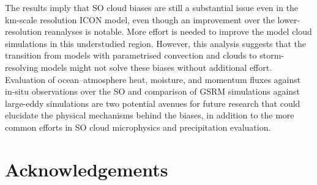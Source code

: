 \documentclass[12pt,a4paper]{article}
\begin{document}
The results imply that SO cloud biases are still a substantial issue even in
the km-scale resolution ICON model, even though an improvement over the
lower-resolution reanalyses is notable. More effort is needed to improve the
model cloud simulations in this understudied region. However, this analysis
suggests that the transition from models with parametrised convection and
clouds to storm-resolving models might not solve these biases without
additional effort.  Evaluation of ocean--atmosphere heat, moisture, and
momentum fluxes against in-situ observations over the SO and comparison of GSRM
simulations against large-eddy simulations are two potential avenues for future
research that could elucidate the physical mechanisms behind the biases, in
addition to the more common efforts in SO cloud microphysics and precipitation
evaluation.

\fontsize{12pt}{14pt}\selectfont
\section*{Acknowledgements}
\end{document}
